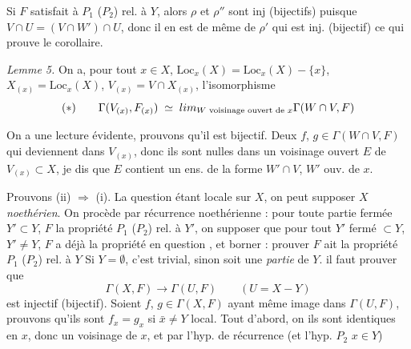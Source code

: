 \documentclass[11pt,a4paper]{article}
\begin{document}
Si $F$ satisfait à $P_1$ ($P_2$) rel. à $Y$, alors $\rho$ et $\rho''$ sont \struck{\ill{}} inj (bijectifs) puisque $V \cap U = (V \cap W') \cap U$, donc \struck{\ill{}} il en est \struck{\ill{}} \ill{} de même de $\rho'$ qui est inj. (bijectif)  ce qui prouve le corollaire.

\struck{\ill{}} 

\emph{Lemme 5.} On a, pour tout $x \in X$, \struck{\ill{}}  \ill{} \struck{\ill{}} $\mathrm{Loc}_x(X) = \mathrm{Loc}_x(X) - \{x\}$, $X_{(x)} = \mathrm{Loc}_x(X)$,  $V_{(x)} = V \cap X_{(x)}$, l'isomorphisme 
\[
  (*) \qquad \Gamma(V_{(x)}, F_{(x)}) \;\simeq\; \varinjlim_{W \text{ voisinage ouvert de } x} \Gamma(W \cap V, F)
\]

On a une lecture évidente, prouvons qu'il  est bijectif. Deux $f$, $g \in \Gamma(W \cap V, F)$ qui deviennent \struck{\ill{}}  \struck{\ill{}} dans $V_{(x)}$, donc ils sont \ill{} nulles dans un voisinage ouvert $E$ de $V_{(x)} \subset X$, \struck{\ill{}} je dis que $E$ contient un ens. de la forme $W' \cap V$, $W'$ ouv. \ill{} de $x$.

Prouvons \ill{} (ii) $\Rightarrow$ (i). La question étant locale sur $X$, on peut supposer $X$ \emph{noethérien}. On procède par récurrence noethérienne  \ill{} : pour toute partie fermée $Y' \subset Y$, $F$ \ill{} la propriété $P_1$ ($P_2$) rel. à $Y'$, on \ill{} supposer \ill{} que \ill{} pour tout $Y'$ fermé $\subset Y$, $Y' \neq Y$,  \ill{} $F$ a déjà la propriété en question \ill{}, et borner : prouver \ill{} $F$ ait la propriété $P_1$ ($P_2$) rel. à $Y$ \ill{} \struck{\ill{}} Si $Y = \emptyset$, c'est trivial, \struck{\ill{}} sinon \struck{\ill{}} \ill{} soit \ill{} une \emph{partie} de $Y$. \ill{} \ill{} \ill{} il faut prouver que
\[
  \Gamma(X,F) \longrightarrow \Gamma(U,F) \qquad (U = X - Y)
\]
est injectif (bijectif). Soient $f$, $g \in \Gamma(X,F)$ ayant \ill{} même image dans $\Gamma(U,F)$, prouvons qu'ils sont  \ill{} \struck{\ill{}} \ill{}  $f_x = g_x$ si \ill{} $\bar{x} \neq Y$  local. Tout d'abord, on \struck{\ill{}} \ill{} ils sont identiques en $x$, donc un voisinage de $x$, et \ill{} \ill{} par l'hyp. de récurrence \ill{} \ill{} \ill{} (et l'hyp. $P_2$ \ill{} $x \in Y$)
\end{document}
